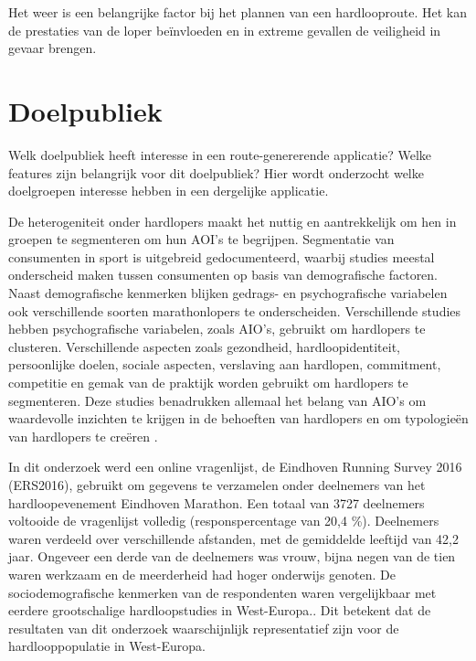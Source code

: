     Het weer is een belangrijke factor bij het plannen van een hardlooproute. Het kan de prestaties van de loper beïnvloeden en in extreme gevallen de veiligheid in gevaar brengen.

    \section{Doelpubliek}

    Welk doelpubliek heeft interesse in een route-genererende applicatie? Welke features zijn belangrijk voor dit doelpubliek?
    Hier wordt onderzocht welke doelgroepen interesse hebben in een dergelijke applicatie.


    De heterogeniteit onder hardlopers maakt het nuttig en aantrekkelijk om hen in groepen te segmenteren om hun AOI's te begrijpen. 
    Segmentatie van consumenten in sport is uitgebreid gedocumenteerd, waarbij studies meestal onderscheid maken tussen consumenten 
    op basis van demografische factoren. Naast demografische kenmerken blijken gedrags- en psychografische variabelen ook 
    verschillende soorten marathonlopers te onderscheiden. Verschillende studies hebben psychografische variabelen, zoals AIO's, 
    gebruikt om hardlopers te clusteren. Verschillende aspecten zoals gezondheid, hardloopidentiteit, persoonlijke doelen, sociale aspecten, 
    verslaving aan hardlopen, commitment, competitie en gemak van de praktijk worden gebruikt om hardlopers te segmenteren.
    Deze studies benadrukken allemaal het belang van AIO's om waardevolle inzichten te krijgen in de behoeften van hardlopers 
    en om typologieën van hardlopers te creëren \textcite{Janssen2020}. 


    In dit onderzoek werd een online vragenlijst, de Eindhoven Running Survey 2016 (ERS2016), 
    gebruikt om gegevens te verzamelen onder deelnemers van het hardloopevenement Eindhoven Marathon. 
    Een totaal van 3727 deelnemers voltooide de vragenlijst volledig (responspercentage van 20,4 \%). 
    Deelnemers waren verdeeld over verschillende afstanden, met de gemiddelde leeftijd van 42,2 jaar. 
    Ongeveer een derde van de deelnemers was vrouw, bijna negen van de tien waren werkzaam en de meerderheid had hoger onderwijs genoten. 
    De sociodemografische kenmerken van de respondenten waren vergelijkbaar met eerdere grootschalige hardloopstudies in West-Europa.\textcite{Janssen2020}.
    Dit betekent dat de resultaten van dit onderzoek waarschijnlijk representatief zijn voor de hardlooppopulatie in West-Europa.


